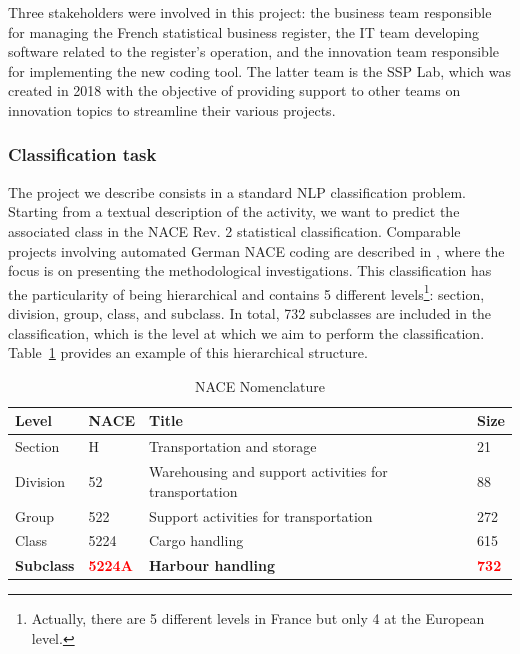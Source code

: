\documentclass[graybox]{svmult}
\begin{document}
Three stakeholders were involved in this project: the business team responsible for managing the French statistical business register, the IT team developing software related to the register's operation, and the innovation team responsible for implementing the new coding tool. The latter team is the SSP Lab, which was created in 2018 with the objective of providing support to other teams on innovation topics to streamline their various projects.

\subsubsection{Classification task}

The project we describe consists in a standard NLP classification problem. Starting from a textual description of the activity, we want to predict the associated class in the NACE Rev. 2 statistical classification. Comparable projects involving automated German NACE coding are described in \citet{beuteretal2024denacecoding}, where the focus is on presenting the methodological investigations. This classification has the particularity of being hierarchical and contains 5 different levels\footnote{Actually, there are 5 different levels in France but only 4 at the European level.}: section, division, group, class, and subclass. In total, 732 subclasses are included in the classification, which is the level at which we aim to perform the classification. Table~\ref{tab:nace-nomenclature} provides an example of this hierarchical structure.

\begin{table}[htbp]
    \centering
    \begin{tabular}{llll}
    \textbf{Level} & \textbf{NACE} & \textbf{Title} & \textbf{Size} \\ \hline
    Section & H & Transportation and storage & 21 \\ \hline
    Division & 52 & Warehousing and support activities for transportation & 88 \\ \hline
    Group & 522 & Support activities for transportation & 272 \\ \hline
    Class & 5224 & Cargo handling & 615 \\ \hline
    \textbf{Subclass} & \textbf{\textcolor{red}{5224A}} & \textbf{Harbour handling} & \textbf{\textcolor{red}{732}} \\ 
    \end{tabular}
    \caption{NACE Nomenclature}
    \label{tab:nace-nomenclature}
    \end{table}
\end{document}
